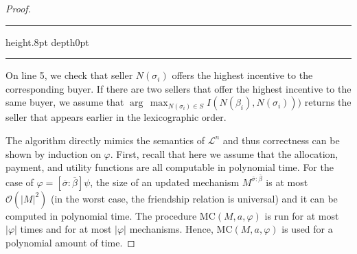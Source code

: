 \documentclass[letterpaper]{article} %
\makeatletter
\theoremstyle{definition}
\newenvironment{breakablealgorithm}
  {%
   \begin{center}
     \refstepcounter{algorithm}%
     \hrule height.8pt depth0pt \kern2pt%
     \renewcommand{\caption}[2][\relax]{%
       {\raggedright\textbf{\fname@algorithm~\thealgorithm} ##2\par}%
       \ifx\relax##1\relax %
         \addcontentsline{loa}{algorithm}{\protect\numberline{\thealgorithm}##2}%
       \else %
         \addcontentsline{loa}{algorithm}{\protect\numberline{\thealgorithm}##1}%
       \fi
       \kern2pt\hrule\kern2pt
     }
  }{%
     \kern2pt\hrule\relax%
   \end{center}
  }
\makeatother
\begin{document}
\begin{proof}
\begin{breakablealgorithm}
\begin{algorithmic}[1]
{} 
\EndIf
\Else
{}
\EndIf
\EndFor
{}
\EndCase

\Case{$\varphi = \heartsuit \gamma$}
\If{$\gamma \neq \bullet$}
\Else
{}
\EndIf
\EndCase
   \EndProcedure

	\end{algorithmic}
\end{breakablealgorithm}

On line 5, we check that seller $N(\sigma_i)$ offers the highest incentive to the corresponding buyer. If there are two sellers that offer the highest incentive to the same buyer, we assume that $\arg\,\max_{N(\sigma_i) \in S} I (N(\beta_i),N(\sigma_i)))$ returns the seller that appears earlier in the lexicographic order.

The algorithm directly mimics %
the semantics of $\mathcal{L}^n$ and thus correctness can be shown by induction on $\varphi$. %
First, recall that here we assume that the allocation, payment, and utility functions are all computable in polynomial time. For the case of $\varphi = [\overline{\sigma}:\overline{\beta}] \psi$, the size of an updated mechanism $M^{\overline{\sigma}:\overline{\beta}}$ is at most $\mathcal{O}(|M|^2)$ (in the worst case, the friendship relation is universal) and it can be computed in polynomial time. The procedure \textsc{MC}$(M, a, \varphi)$ is run for at most $|\varphi|$ times and for at most $|\varphi|$ mechanisms. Hence, \textsc{MC}$(M, a, \varphi)$ is used for a polynomial amount of time.
\end{proof}
\end{document}
